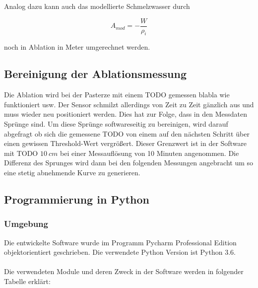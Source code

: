 \documentclass[12pt,a4paper]{article}
\begin{document}
Analog dazu kann auch das modellierte Schmelzwasser durch

\begin{equation}
A_{mod} = -\frac{W}{\rho_{i}}
\end{equation}

noch in Ablation in Meter umgerechnet werden.

\subsection{Bereinigung der Ablationsmessung}
Die Ablation wird bei der Pasterze mit einem TODO gemessen blabla wie funktioniert usw. Der Sensor schmilzt allerdings von Zeit zu Zeit gänzlich aus und muss wieder neu positioniert werden. Dies hat zur Folge, dass in den Messdaten Sprünge sind. Um diese Sprünge softwareseitig zu bereinigen, wird darauf abgefragt ob sich die gemessene TODO von einem auf den nächsten Schritt über einen gewissen Threshold-Wert vergrößert. Dieser Grenzwert ist in der Software mit TODO $10~cm$ bei einer Messauflösung von 10 Minuten angenommen. Die Differenz des Sprunges wird dann bei den folgenden Messungen angebracht um so eine stetig abnehmende Kurve zu generieren.



\subsection{Programmierung in Python}
\subsubsection{Umgebung}

Die entwickelte Software wurde im Programm Pycharm Professional Edition objektorientiert geschrieben. Die verwendete Python Version ist Python 3.6.\\\\
Die verwendeten Module und deren Zweck in der Software werden in folgender Tabelle erklärt:
\end{document}

